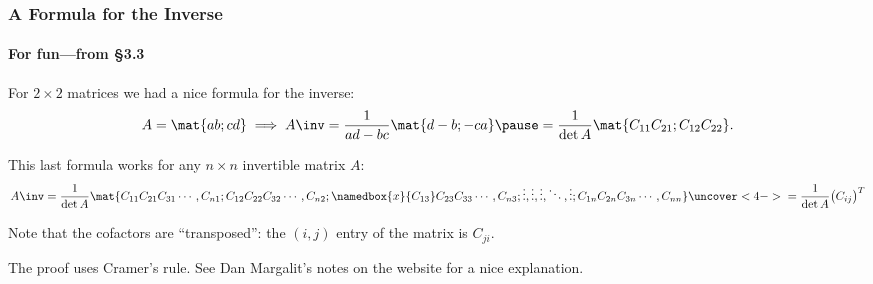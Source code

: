 
\begin{frame}
\frametitle{A Formula for the Inverse}
\framesubtitle{For fun---from \S3.3}

For $2\times 2$ matrices we had a nice formula for the inverse:
\[ A = \mat{a b; c d} \implies
A\inv = \frac 1{ad-bc}\mat{d -b; -c a}
\pause
= \frac 1{\det A}\mat{C_{11} C_{21}; C_{12} C_{22}}. \]
\pause

\begin{thm}
This last formula works for any $n\times n$ invertible matrix $A$:
\[ A\inv = \frac 1{\det A}
\mat{
  C_{11} C_{21} C_{31} \cdots, C_{n1} ;
  C_{12} C_{22} C_{32} \cdots, C_{n2} ;
  \namedbox{x}{C_{13}} C_{23} C_{33} \cdots, C_{n3} ;
  \vdots,\vdots,\vdots,\ddots, \vdots ;
  C_{1n} C_{2n} C_{3n} \cdots, C_{nn}
}
\uncover<4->{{}=\frac 1{\det A}\bigl( C_{ij} \bigr)^T}
 \]
\end{thm}

\pause
Note that the cofactors are ``transposed'': the $(i,j)$ entry of the matrix is
$C_{ji}$.

\pause\medskip
The proof uses Cramer's rule.  See Dan Margalit's notes on the website for a
nice explanation.

\end{frame}




